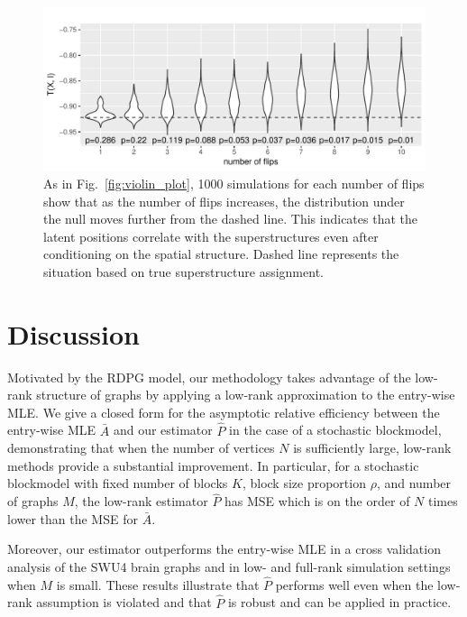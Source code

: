 \documentclass[journal,twoside,web]{ieeecolor}
\begin{document}
\begin{figure}[tbh!]
	\centering
	\includegraphics[width=\linewidth]{mouse_connectome_violin.pdf}
	\caption{
	As in Fig.~\ref{fig:violin_plot}, 1000 simulations for each number of flips show that as the number of flips increases, the distribution under the null moves further from the dashed line. This indicates that the latent positions correlate with the superstructures even after conditioning on the spatial structure. Dashed line represents the situation based on true superstructure assignment.   }
	\label{fig:mouse_violin}
\end{figure}







\section{Discussion}\label{sec:discussion}

Motivated by the RDPG model, our methodology takes advantage of the low-rank structure of graphs by applying a low-rank approximation to the entry-wise MLE.
We give a closed form for the asymptotic relative efficiency between the entry-wise MLE $\bar{A}$ and our estimator $\hat{P}$ in the case of a stochastic blockmodel, demonstrating that when the number of vertices $N$ is sufficiently large, low-rank methods provide a substantial improvement.
In particular, for a stochastic blockmodel with fixed number of blocks $K$, block size proportion $\rho$, and number of graphs $M$, the low-rank estimator $\hat{P}$ has MSE which is on the order of $N$ times lower than the MSE for $\bar{A}$.

Moreover, our estimator outperforms the entry-wise MLE in a cross validation analysis of the SWU4 brain graphs and in low- and full-rank simulation settings when $M$ is small.
These results illustrate that $\hat{P}$ performs well even when the low-rank assumption is violated and that $\hat{P}$ is robust and can be applied in practice.
\end{document}
